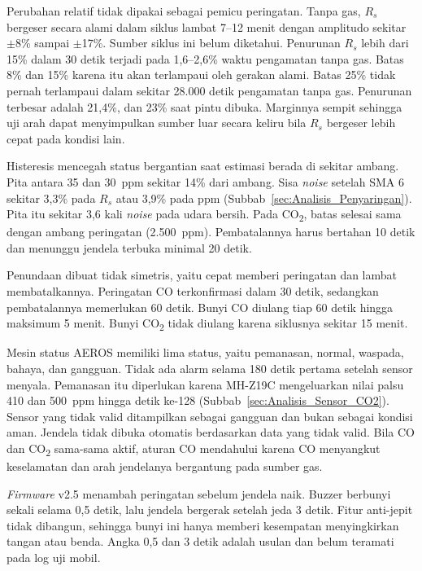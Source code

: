     Perubahan relatif tidak dipakai sebagai pemicu peringatan. Tanpa gas, $R_s$ bergeser secara alami dalam siklus lambat 7--12 menit dengan amplitudo sekitar $\pm$8\% sampai $\pm$17\%. Sumber siklus ini belum diketahui. Penurunan $R_s$ lebih dari 15\% dalam 30 detik terjadi pada 1,6--2,6\% waktu pengamatan tanpa gas. Batas 8\% dan 15\% karena itu akan terlampaui oleh gerakan alami. Batas 25\% tidak pernah terlampaui dalam sekitar 28.000 detik pengamatan tanpa gas. Penurunan terbesar adalah 21,4\%, dan 23\% saat pintu dibuka. Marginnya sempit sehingga uji arah dapat menyimpulkan sumber luar secara keliru bila $R_s$ bergeser lebih cepat pada kondisi lain.

    Histeresis mencegah status bergantian saat estimasi berada di sekitar ambang. Pita antara 35 dan 30~ppm sekitar 14\% dari ambang. Sisa \textit{noise} setelah SMA 6 sekitar 3,3\% pada $R_s$ atau 3,9\% pada ppm (Subbab~\ref{sec:Analisis_Penyaringan}). Pita itu sekitar 3,6 kali \textit{noise} pada udara bersih. Pada CO\textsubscript{2}, batas selesai sama dengan ambang peringatan (2.500~ppm). Pembatalannya harus bertahan 10 detik dan menunggu jendela terbuka minimal 20 detik.

    Penundaan dibuat tidak simetris, yaitu cepat memberi peringatan dan lambat membatalkannya. Peringatan CO terkonfirmasi dalam 30 detik, sedangkan pembatalannya memerlukan 60 detik. Bunyi CO diulang tiap 60 detik hingga maksimum 5 menit. Bunyi CO\textsubscript{2} tidak diulang karena siklusnya sekitar 15 menit.

    Mesin status AEROS memiliki lima status, yaitu pemanasan, normal, waspada, bahaya, dan gangguan. Tidak ada alarm selama 180 detik pertama setelah sensor menyala. Pemanasan itu diperlukan karena MH-Z19C mengeluarkan nilai palsu 410 dan 500~ppm hingga detik ke-128 (Subbab~\ref{sec:Analisis_Sensor_CO2}). Sensor yang tidak valid ditampilkan sebagai gangguan dan bukan sebagai kondisi aman. Jendela tidak dibuka otomatis berdasarkan data yang tidak valid. Bila CO dan CO\textsubscript{2} sama-sama aktif, aturan CO mendahului karena CO menyangkut keselamatan dan arah jendelanya bergantung pada sumber gas.

    \textit{Firmware} v2.5 menambah peringatan sebelum jendela naik. Buzzer berbunyi sekali selama 0,5 detik, lalu jendela bergerak setelah jeda 3 detik. Fitur anti-jepit tidak dibangun, sehingga bunyi ini hanya memberi kesempatan menyingkirkan tangan atau benda. Angka 0,5 dan 3 detik adalah usulan dan belum teramati pada log uji mobil.

